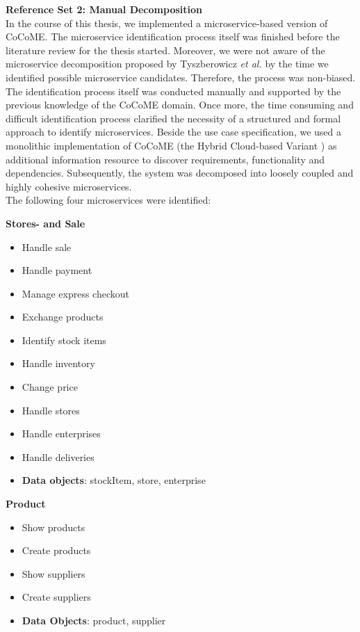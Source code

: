 \noindent
\textbf{Reference Set 2: Manual Decomposition} \\
In the course of this thesis, we implemented a microservice-based version of CoCoME. The microservice identification process itself was finished before the literature review for the thesis started. Moreover, we were not aware of the microservice decomposition proposed by Tyszberowicz \textit{et al.} \cite{FunctionalDecompositionHeinrich} by the time we identified possible microservice candidates. Therefore, the process was non-biased. \\
The identification process itself was conducted manually and supported by the previous knowledge of the CoCoME domain. Once more, the time consuming and difficult identification process clarified the necessity of a structured and formal approach to identify microservices. Beside the use case specification, we used a monolithic implementation of CoCoME (the Hybrid Cloud-based Variant \cite{CoCoMETechnical}) as additional information resource to discover requirements, functionality and dependencies. Subsequently, the system was decomposed into loosely coupled and highly cohesive microservices. \\
The following four microservices were identified:




\begin{multicols}{2}
	\textbf{Stores- and Sale}
	\begin{flushleft}
		\begin{itemize}[noitemsep]
			\item Handle sale
			\item Handle payment
			\item Manage express checkout
			\item Exchange products
			\item Identify stock items
			\item Handle inventory
			\item Change price
			\item Handle stores
			\item Handle enterprises
			\item Handle deliveries
			\item \textbf{Data objects}: stockItem, store, enterprise
		\end{itemize}
	\end{flushleft}
	
	
	\vfill
	\columnbreak
	\textbf{Product}
	\begin{flushleft}
		\begin{itemize}[noitemsep]
			\item Show products
			\item Create products
			\item Show suppliers
			\item Create suppliers
			\item \textbf{Data Objects}: product, supplier
		
		
		\end{itemize}
	\end{flushleft}

\end{multicols}




